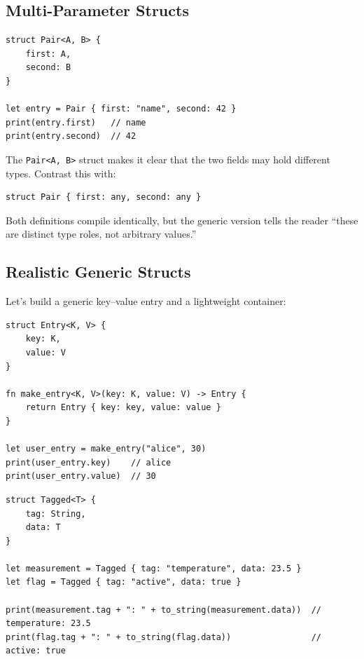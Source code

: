 \subsection{Multi-Parameter Structs}

\begin{lstlisting}[language=Lattice, caption={A struct with two type parameters}]
struct Pair<A, B> {
    first: A,
    second: B
}

let entry = Pair { first: "name", second: 42 }
print(entry.first)   // name
print(entry.second)  // 42
\end{lstlisting}

The \lstinline|Pair<A, B>| struct makes it clear that the two fields may
hold different types. Contrast this with:

\begin{lstlisting}[language=Lattice]
struct Pair { first: any, second: any }
\end{lstlisting}

Both definitions compile identically, but the generic version tells the
reader ``these are distinct type roles, not arbitrary values.''

\subsection{Realistic Generic Structs}

Let's build a generic key--value entry and a lightweight container:

\begin{lstlisting}[language=Lattice, caption={Generic key-value entry}]
struct Entry<K, V> {
    key: K,
    value: V
}

fn make_entry<K, V>(key: K, value: V) -> Entry {
    return Entry { key: key, value: value }
}

let user_entry = make_entry("alice", 30)
print(user_entry.key)    // alice
print(user_entry.value)  // 30
\end{lstlisting}

\begin{lstlisting}[language=Lattice, caption={A generic wrapper with a label}]
struct Tagged<T> {
    tag: String,
    data: T
}

let measurement = Tagged { tag: "temperature", data: 23.5 }
let flag = Tagged { tag: "active", data: true }

print(measurement.tag + ": " + to_string(measurement.data))  // temperature: 23.5
print(flag.tag + ": " + to_string(flag.data))                // active: true
\end{lstlisting}

